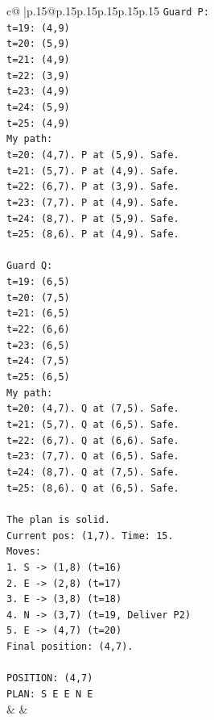 \documentclass{article}
\begin{document}
{\begin{supertabular}{c@{$\;$}|p{.15\linewidth}@{}p{.15\linewidth}p{.15\linewidth}p{.15\linewidth}p{.15\linewidth}p{.15\linewidth}}
{{{\texttt{Guard P:} \\
\texttt{t=19: (4,9)} \\
\texttt{t=20: (5,9)} \\
\texttt{t=21: (4,9)} \\
\texttt{t=22: (3,9)} \\
\texttt{t=23: (4,9)} \\
\texttt{t=24: (5,9)} \\
\texttt{t=25: (4,9)} \\
\texttt{My path:} \\
\texttt{t=20: (4,7). P at (5,9). Safe.} \\
\texttt{t=21: (5,7). P at (4,9). Safe.} \\
\texttt{t=22: (6,7). P at (3,9). Safe.} \\
\texttt{t=23: (7,7). P at (4,9). Safe.} \\
\texttt{t=24: (8,7). P at (5,9). Safe.} \\
\texttt{t=25: (8,6). P at (4,9). Safe.} \\
\\ 
\texttt{Guard Q:} \\
\texttt{t=19: (6,5)} \\
\texttt{t=20: (7,5)} \\
\texttt{t=21: (6,5)} \\
\texttt{t=22: (6,6)} \\
\texttt{t=23: (6,5)} \\
\texttt{t=24: (7,5)} \\
\texttt{t=25: (6,5)} \\
\texttt{My path:} \\
\texttt{t=20: (4,7). Q at (7,5). Safe.} \\
\texttt{t=21: (5,7). Q at (6,5). Safe.} \\
\texttt{t=22: (6,7). Q at (6,6). Safe.} \\
\texttt{t=23: (7,7). Q at (6,5). Safe.} \\
\texttt{t=24: (8,7). Q at (7,5). Safe.} \\
\texttt{t=25: (8,6). Q at (6,5). Safe.} \\
\\ 
\texttt{The plan is solid.} \\
\texttt{Current pos: (1,7). Time: 15.} \\
\texttt{Moves:} \\
\texttt{1. S {-}> (1,8) (t=16)} \\
\texttt{2. E {-}> (2,8) (t=17)} \\
\texttt{3. E {-}> (3,8) (t=18)} \\
\texttt{4. N {-}> (3,7) (t=19, Deliver P2)} \\
\texttt{5. E {-}> (4,7) (t=20)} \\
\texttt{Final position: (4,7).} \\
\\ 
\texttt{POSITION: (4,7)} \\
\texttt{PLAN: S E E N E} \\
            }
        }
    }
    & & \\ \\


\end{supertabular}}
\end{document}
